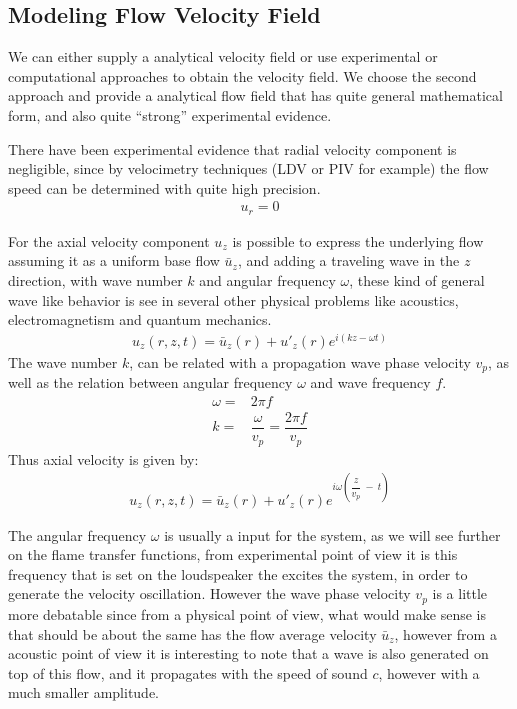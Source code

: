 \clearpage
\subsection{Modeling Flow Velocity Field}
We can either supply a analytical velocity field or use experimental or computational approaches to obtain the velocity field.
We choose the second approach and provide a analytical flow field that has quite general mathematical form, and also quite ``strong'' experimental evidence.

\begin{assumption} 
There have been experimental evidence that radial velocity component is negligible, since by velocimetry techniques (LDV or PIV for example) the flow speed can be determined with quite high precision.
\begin{align}
	u_r=0
\end{align}

For the axial velocity component $u_z$ is possible to express the underlying flow assuming it as a uniform base flow $\bar{u}_z$, and adding a traveling wave in the $z$ direction, with wave number $k$ and angular frequency $\omega$, these kind of general wave like behavior is see in several other physical problems like acoustics, electromagnetism and quantum mechanics.
\begin{align*}
	u_z(r,z,t)=\bar{u}_z(r) + u'_z(r)e^{i(kz - \omega t)}
\end{align*}
The wave number $k$, can be related with a propagation wave phase velocity $v_p$, as well as the relation between angular frequency $\omega$ and wave frequency $f$. 
\begin{align}
	\omega=&2 \pi f\\
	k =&\dfrac{\omega}{v_p}= \dfrac{2\pi f}{v_p}
\end{align}
Thus axial velocity is given by:
\begin{align}
	u_z(r,z,t)=\bar{u}_z(r) + u'_z(r)e^{i\omega\left(\dfrac{z}{v_p}\ -\ t\right)}
\end{align}
\label{u_ass}
\end{assumption}

The angular frequency $\omega$ is usually a input for the system, as we will see further on the flame transfer functions, from experimental point of view it is this frequency that is set on the loudspeaker the excites the system, in order to generate the velocity oscillation. 
However the wave phase velocity $v_p$ is a little more debatable since from a physical point of view, what would make sense is that should be about the same has the flow average velocity $\bar{u}_z$, however from a acoustic point of view it is interesting to note that a wave is also generated on top of this flow, and it propagates with the speed of sound $c$, however with a much smaller amplitude.

